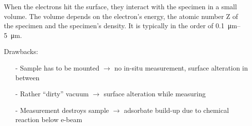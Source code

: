 When the electrons hit the surface, they interact with the specimen in a small volume. The volume depends on the electron's energy, the atomic number Z of the specimen and the specimen's density. It is typically in the order of \SIrange{0.1}{5}{\micro \meter}.

Drawbacks:
\begin{itemize}
 \item[-] Sample has to be mounted $\rightarrow$ no in-situ measurement, surface alteration in between
 \item[-] Rather ``dirty'' vacuum $\rightarrow$ surface alteration while measuring
 \item[-] Measurement destroys sample $\rightarrow$ adsorbate build-up due to chemical reaction below e-beam
\end{itemize}

